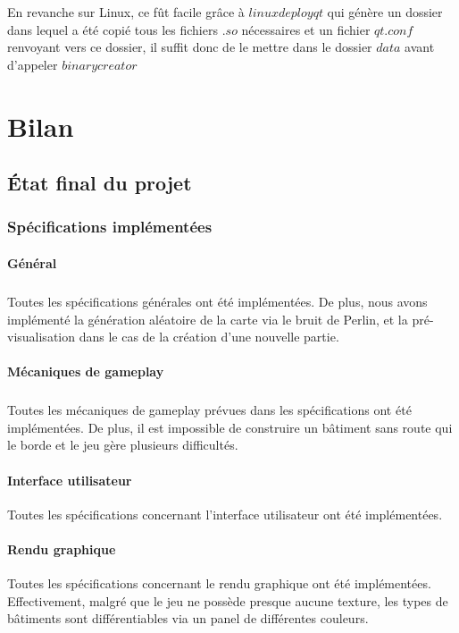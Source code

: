 \documentclass[a4paper,10pt,openany,oneside]{report}
\begin{document}
En revanche sur Linux, ce fût facile grâce à $linuxdeployqt$ qui génère un dossier dans lequel a été copié tous les fichiers $.so$ nécessaires et un fichier $qt.conf$ renvoyant vers ce dossier, il suffit donc de le mettre dans le dossier $data$ avant d'appeler $binarycreator$



\chapter{Bilan}
\thispagestyle{headings}
\section{État final du projet}
\subsection{Spécifications implémentées}
\subsubsection{Général}
\paragraph{}
Toutes les spécifications générales ont été implémentées.
De plus, nous avons implémenté la génération aléatoire de la carte via le bruit de Perlin, et la pré-visualisation dans le cas de la création d'une nouvelle partie.
\subsubsection{Mécaniques de gameplay}
\paragraph{}
Toutes les mécaniques de gameplay prévues dans les spécifications ont été implémentées.
De plus, il est impossible de construire un bâtiment sans route qui le borde et le jeu gère plusieurs difficultés.

\subsubsection{Interface utilisateur}
Toutes les spécifications concernant l'interface utilisateur ont été implémentées.

\subsubsection{Rendu graphique}
Toutes les spécifications concernant le rendu graphique ont été implémentées. Effectivement, malgré que le jeu ne possède presque aucune texture, les types de bâtiments sont différentiables via un panel de différentes couleurs.
\end{document}
